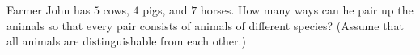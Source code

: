 Farmer John has $ 5$ cows, $ 4$ pigs, and $ 7$ horses. How many ways can he pair up the animals so that every pair consists of animals of different species? (Assume that all animals are distinguishable from each other.)